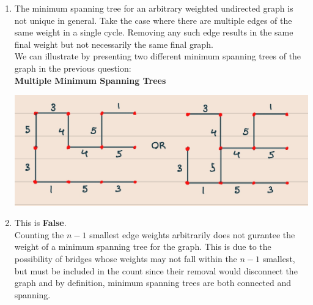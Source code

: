 \documentclass{article}
\begin{document}
\begin{enumerate}[label=(\alph*), left=10pt, itemsep=10pt]
        \item \begin{minipage}[t]{0.9\textwidth}
            The minimum spanning tree for an arbitrary weighted undirected graph is not unique
            in general. Take the case where there are multiple edges of the same weight in a
            single cycle. Removing any such edge results in the same final weight but not
            necessarily the same final graph.\\

            We can illustrate by presenting two different minimum spanning trees of the
            graph in the previous question:\\

            \textbf{Multiple Minimum Spanning Trees}\\
                \begin{minipage}[t]{0.9\textwidth}
                    \vspace{0.1em} %
                    \centering
                    \includegraphics[width=5.9in]{./4b.jpg} 
                \end{minipage}
        \end{minipage}

        \item \begin{minipage}[t]{0.9\textwidth}
            This is \textbf{False}.\\
            Counting the $n-1$ smallest edge weights arbitrarily does not gurantee the weight
            of a minimum spanning tree for the graph. This is due to the possibility of bridges
            whose weights may not fall within the $n-1$ smallest, but must be included in the
            count since their removal would disconnect the graph and by definition, minimum
            spanning trees are both connected and spanning.
        \end{minipage}
    \end{enumerate}
    \vspace{1em}
\end{document}
